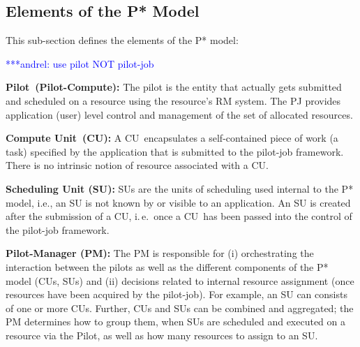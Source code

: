 \documentclass[conference,final]{IEEEtran}
\makeatletter
\def\blueuwave{\bgroup \markoverwith{\lower3.5\p@\hbox{\sixly \textcolor{blue}{\char58}}}\ULon}
\newcommand{\alwave}[1]{ {\blueuwave{#1}}}
\newcommand{\alnote}[1]{ {\textcolor{blue} { ***andrel: #1 }}}
\newcommand{\alnote}[1]{}
\newcommand{\pilot}{Pilot\xspace}
\newcommand{\computeunit}{Compute Unit\xspace}
\newcommand{\cu}{CU\xspace}
\newcommand{\cus}{CUs\xspace}
\newcommand{\sus}{SUs\xspace}
\newcommand{\upp}{\vspace*{-0.5em}}
\makeatother
\begin{document}
%

\noindent 
\subsection{Elements of the P* Model \upp\upp}
\noindent This sub-section defines the elements of the P* model:

\alnote{use pilot NOT pilot-job}
\begin{compactitem}
\item \textbf{\pilot \ (Pilot-Compute):} The pilot is the
  entity that actually gets submitted and scheduled on a resource
  using the resource's RM system. The PJ provides application (user)
  level control and management of the set of allocated resources.



\item \textbf{\computeunit \ (\cu):} A \cu \ encapsulates a self-contained
  piece of work (a task) specified by the application that is
  submitted to the pilot-job framework.  There is no intrinsic notion
  of resource associated with a \cu.

\item \textbf{Scheduling Unit (SU):} SUs are the units of scheduling
  used internal to the P* model, i.e., an SU is not known by or
  visible to an application. An SU is created after the submission of
  a \cu, i.\,e.\ once a \cu \ has been passed into the control of the
  pilot-job framework.

\item \textbf{Pilot-Manager (PM):} The PM is responsible for (i)
  orchestrating the interaction between the pilots as well as the
  different components of the P* model (\cus, \sus) and (ii) decisions
  related to internal resource assignment (once resources have been
  acquired by the pilot-job).  For example, an SU can consists of one
  or more \cus. Further, \cus and \sus can be combined and aggregated;
  the PM determines how to group them, when \sus are scheduled and
  executed on a resource via the \pilot, as well as how many resources
  to assign to an SU.



\end{compactitem}
\end{document}
